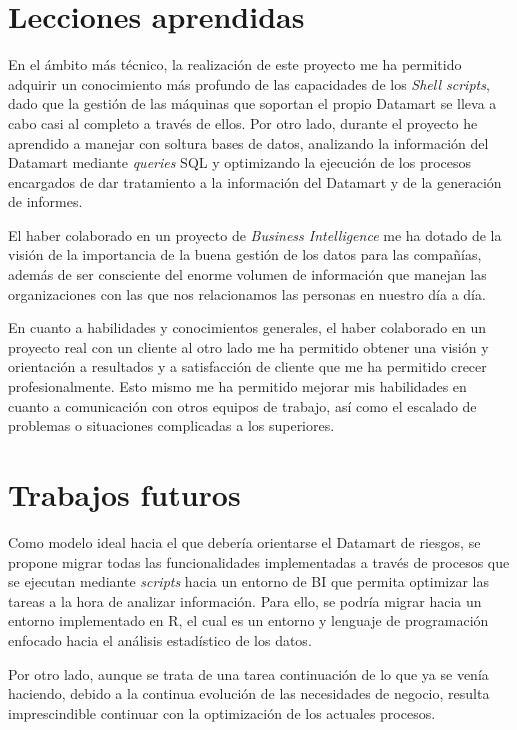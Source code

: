 \documentclass[a4paper, 12pt]{book}
\begin{document}
\section{Lecciones aprendidas}
\label{sec:lecciones_aprendidas}

En el ámbito más técnico, la realización de este proyecto me ha permitido adquirir un conocimiento más profundo de las capacidades de los \textit{Shell scripts}, dado que la gestión de las máquinas que soportan el propio Datamart se lleva a cabo casi al completo a través de ellos. Por otro lado, durante el proyecto he aprendido a manejar con soltura bases de datos, analizando la información del Datamart mediante \textit{queries} SQL y optimizando la ejecución de los procesos encargados de dar tratamiento a la información del Datamart y de la generación de informes.

El haber colaborado en un proyecto de \textit{Business Intelligence} me ha dotado de la visión de la importancia de la buena gestión de los datos para las compañías, además de ser consciente del enorme volumen de información que manejan las organizaciones con las que nos relacionamos las personas en nuestro día a día.

En cuanto a habilidades y conocimientos generales, el haber colaborado en un proyecto real con un cliente al otro lado me ha permitido obtener una visión y orientación a resultados y a satisfacción de cliente que me ha permitido crecer profesionalmente. Esto mismo me ha permitido mejorar mis habilidades en cuanto a comunicación con otros equipos de trabajo, así como el escalado de problemas o situaciones complicadas a los superiores.

\section{Trabajos futuros}
\label{sec:trabajos_futuros}

Como modelo ideal hacia el que debería orientarse el Datamart de riesgos, se propone migrar todas las funcionalidades implementadas a través de procesos que se ejecutan mediante \textit{scripts} hacia un entorno de BI que permita optimizar las tareas a la hora de analizar información. Para ello, se podría migrar hacia un entorno implementado en R, el cual es un entorno y lenguaje de programación enfocado hacia el análisis estadístico de los datos.

Por otro lado, aunque se trata de una tarea continuación de lo que ya se venía haciendo, debido a la continua evolución de las necesidades de negocio, resulta imprescindible continuar con la optimización de los actuales procesos.
\end{document}
